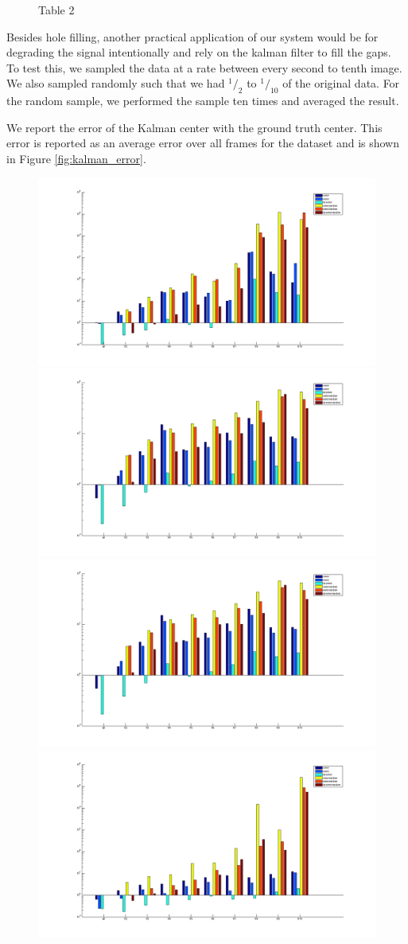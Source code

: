 \documentclass[12pt]{article}
\begin{document}
\begin{figure}
\centering
\caption{Table 2}
\label{fig:table2}
\end{figure}

Besides hole filling, another practical application of our system would be for degrading the signal intentionally and rely on the kalman filter to fill the gaps. To test this, we sampled the data at a rate between every second to tenth image.  We also sampled randomly such that we had $^1/_2$ to $^1/_{10}$ of the original data.  For the random sample, we performed the sample ten times and averaged the result.

We report the error of the Kalman center with the ground truth center.  This error is reported as an average error over all frames for the dataset and is shown in Figure \ref{fig:kalman_error}.
\begin{figure}[h]
\includegraphics[width=.5\textwidth]{kalman_nov_1.png}
\includegraphics[width=.5\textwidth]{kalman_nov_2.png}
\includegraphics[width=.5\textwidth]{kalman_nov_2.png}
\includegraphics[width=.5\textwidth]{kalman_dec_1.png}

\end{figure}
\end{document}
